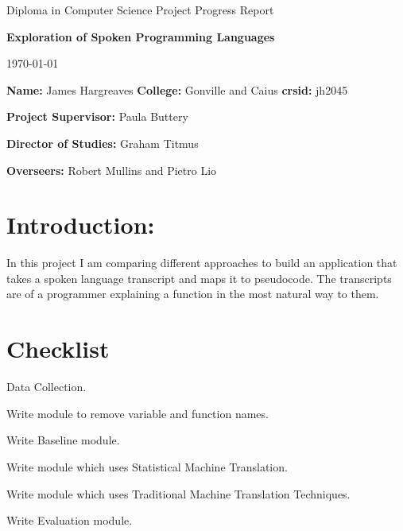 \documentclass[12pt]{article}
\newcommand{\cmark}{\ding{51}}
\newcommand{\done}{\rlap{$\square$}{\raisebox{2pt}{\large\hspace{1pt}\cmark}}%
\hspace{-2.5pt}}
\begin{document}
\thispagestyle{empty}


\vfil

\centerline{\large Diploma in Computer Science Project Progress Report}
\vspace{0.4in}
\centerline{\Large\bf Exploration of Spoken Programming Languages}
\vspace{0.3in}
\centerline{\today}

{\bf Name:} James Hargreaves
{\bf College:} Gonville and Caius
{\bf crsid:} jh2045

{\bf Project Supervisor:} Paula Buttery

{\bf Director of Studies:}  Graham Titmus

{\bf Overseers:} Robert Mullins and Pietro Lio
\section{Introduction:}
In this project I am comparing different approaches to build an application that takes a spoken language transcript and maps it to pseudocode. The transcripts are of a programmer explaining a function in the most natural way to them. 



\section{Checklist}
\begin{todolist} 
\item[\done] Data Collection.
\item[\done] Write module to remove variable and function names.
\item[\done] Write Baseline module.
\item[\done] Write module which uses Statistical Machine Translation.
\item Write module which uses Traditional Machine Translation Techniques.
\item[\done] Write Evaluation module.
\end{todolist}
\end{document}
